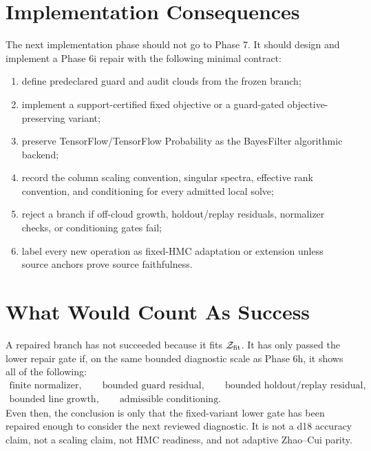 \documentclass[11pt]{article}
\newcommand{\calZ}{\mathcal Z}
\begin{document}
\section{Implementation Consequences}

The next implementation phase should not go to Phase 7.  It should design and
implement a Phase 6i repair with the following minimal contract:
\begin{enumerate}[leftmargin=2em]
    \item define predeclared guard and audit clouds from the frozen branch;
    \item implement a support-certified fixed objective or a guard-gated
    objective-preserving variant;
    \item preserve TensorFlow/TensorFlow Probability as the BayesFilter
    algorithmic backend;
    \item record the column scaling convention, singular spectra, effective
    rank convention, and conditioning for every admitted local solve;
    \item reject a branch if off-cloud growth, holdout/replay residuals,
    normalizer checks, or conditioning gates fail;
    \item label every new operation as fixed-HMC adaptation or extension unless
    source anchors prove source faithfulness.
\end{enumerate}

\section{What Would Count As Success}

A repaired branch has not succeeded because it fits \(\calZ_{\rm fit}\).  It
has only passed the lower repair gate if, on the same bounded diagnostic scale
as Phase 6h, it shows all of the following:
\[
\begin{gathered}
    \text{finite normalizer},\qquad
    \text{bounded guard residual},\qquad
    \text{bounded holdout/replay residual},\\
    \text{bounded line growth},\qquad
    \text{admissible conditioning}.
\end{gathered}
\]
Even then, the conclusion is only that the fixed-variant lower gate has been
repaired enough to consider the next reviewed diagnostic.  It is not a d18
accuracy claim, not a scaling claim, not HMC readiness, and not adaptive
Zhao--Cui parity.
\end{document}
